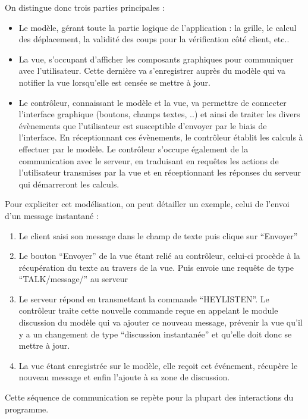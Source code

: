 \documentclass[a4paper, 11pt]{report}
\begin{document}
On distingue donc trois parties principales :
\begin{itemize}
  \item Le modèle, gérant toute la partie logique de l'application : la grille, le calcul des déplacement, la validité des coups pour la vérification côté client, etc..
  \item La vue, s'occupant d'afficher les composants graphiques pour communiquer avec l'utilisateur.
    Cette dernière va s'enregistrer auprès du modèle qui va notifier la vue lorsqu'elle est censée
    se mettre à jour.
  \item Le contrôleur, connaissant le modèle et la vue, va permettre de connecter l'interface
    graphique (boutons, champs textes, ..) et ainsi de traiter les divers évènements que
    l'utilisateur est susceptible d'envoyer par le biais de l'interface. En réceptionnant ces
    évènements, le contrôleur établit les calculs à effectuer par le modèle. Le contrôleur
    s'occupe également de la communication avec le serveur, en traduisant en requêtes
    les actions de l'utilisateur transmises par la vue et en réceptionnant les réponses du
    serveur qui démarreront les calculs.
\end{itemize}

Pour expliciter cet modélisation, on peut détailler un exemple, celui de l'envoi d'un
message instantané :
\begin{enumerate}
  \item Le client saisi son message dans le champ de texte puis clique sur ``Envoyer''
  \item Le bouton ``Envoyer'' de la vue étant relié au contrôleur, celui-ci procède à la récupération
    du texte au travers de la vue. Puis envoie une requête de type ``TALK/message/'' au
    serveur
  \item Le serveur répond en transmettant la commande ``HEYLISTEN''. Le contrôleur traite
    cette nouvelle commande reçue en appelant le module discussion du modèle qui va
    ajouter ce nouveau message, prévenir la vue qu'il y a un changement de type
    ``discussion instantanée'' et qu'elle doit donc se mettre à jour.
  \item La vue étant enregistrée sur le modèle, elle reçoit cet événement, récupère le nouveau
    message et enfin l'ajoute à sa zone de discussion.
\end{enumerate}

Cette séquence de communication se repète pour la plupart des interactions du programme.
\end{document}
